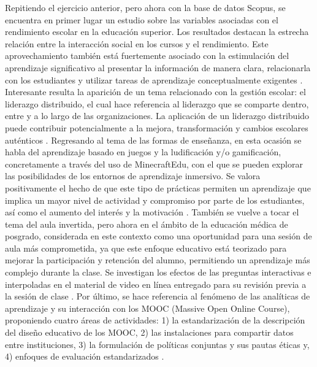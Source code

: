\documentclass[spanish]{textolivre}
\begin{document}
Repitiendo el ejercicio anterior, pero ahora con la base de datos Scopus, se encuentra en primer lugar un estudio sobre las variables asociadas con el rendimiento escolar en la educación superior. Los resultados destacan la estrecha relación entre la interacción social en los cursos y el rendimiento. Este aprovechamiento también está fuertemente asociado con la estimulación del aprendizaje significativo al presentar la información de manera clara, relacionarla con los estudiantes y utilizar tareas de aprendizaje conceptualmente exigentes \cite{schneider2017}. Interesante resulta la aparición de un tema relacionado con la gestión escolar: el liderazgo distribuido, el cual hace referencia al liderazgo que se comparte dentro, entre y a lo largo de las organizaciones. La aplicación de un liderazgo distribuido puede contribuir potencialmente a la mejora, transformación y cambios escolares auténticos \cite{harris2016}. Regresando al tema de las formas de enseñanza, en esta ocasión se habla del aprendizaje basado en juegos y la ludificación y/o gamificación, concretamente a través del uso de MinecraftEdu, con el que se pueden explorar las posibilidades de los entornos de aprendizaje inmersivo. Se valora positivamente el hecho de que este tipo de prácticas permiten un aprendizaje que implica un mayor nivel de actividad y compromiso por parte de los estudiantes, así como el aumento del interés y la motivación \cite{cozar-gutierrez2016}. También se vuelve a tocar el tema del aula invertida, pero ahora en el ámbito de la educación médica de posgrado, considerada en este contexto como una oportunidad para una sesión de aula más comprometida, ya que este enfoque educativo está teorizado para mejorar la participación y retención del alumno, permitiendo un aprendizaje más complejo durante la clase. Se investigan los efectos de las preguntas interactivas e interpoladas en el material de video en línea entregado para su revisión previa a la sesión de clase \cite{rose2016}. Por último, se hace referencia al fenómeno de las analíticas de aprendizaje y su interacción con los MOOC (Massive Open Online Course), proponiendo cuatro áreas de actividades: 1) la estandarización de la descripción del diseño educativo de los MOOC, 2) las instalaciones para compartir datos entre instituciones, 3) la formulación de políticas conjuntas y sus pautas éticas y, 4) enfoques de evaluación estandarizados \cite{drachsler2016}.
\end{document}
